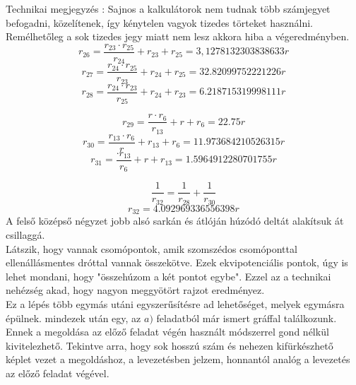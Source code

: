 \documentclass[11pt,a4paper,openany,leqno]{article}
\begin{document}
Technikai megjegyzés : Sajnos a kalkulátorok nem tudnak több számjegyet befogadni, közelítenek, így kénytelen vagyok tizedes törteket használni. Remélhetőleg a sok tizedes jegy miatt nem lesz akkora hiba a végeredményben.\\
$$ r_{26} = \frac{r_{23} \cdot r_{25}}{r_{24}} + r_{23} + r_{25} = 3,1278132303838633r $$
$$ r_{27} = \frac{r_{24} \cdot r_{25}}{r_{23}} + r_{24} + r_{25} = 32.82099752221226r $$
$$ r_{28} = \frac{r_{24} \cdot r_{23}}{r_{25}} + r_{24} + r_{23} = 6.218715319998111r $$

$$ r_{29} = \frac{r \cdot r_{6}}{r_{13}} + r + r_{6} = 22.75r $$
$$ r_{30} = \frac{r_{13} \cdot r_{6}}{r} + r_{13} + r_{6} = 11.973684210526315r $$
$$ r_{31} = \frac{ \cdot r_{13}}{r_{6}} + r + r_{13} = 1.5964912280701755r $$

$$ \frac{1}{r_{32}} = \frac{1}{r_{28}} + \frac{1}{r_{30}} $$
$$ r_{32} = 4.092969336556398r $$
\newpage
A felső középső négyzet jobb alsó sarkán és átlóján húzódó deltát alakítsuk át csillaggá. \\
Látszik, hogy vannak csomópontok, amik szomszédos csomóponttal ellenállásmentes dróttal vannak összekötve. Ezek ekvipotenciális pontok, úgy is lehet mondani, hogy "összehúzom a két pontot egybe". Ezzel az a technikai nehézség akad, hogy nagyon meggyötört rajzot eredményez.\\ \indent
Ez a lépés több egymás utáni egyszerűsítésre ad lehetőséget, melyek egymásra épülnek. mindezek után egy, az $a)$ feladatból már ismert gráffal találkozunk. Ennek a megoldása az előző feladat végén használt módszerrel gond nélkül kivitelezhető. Tekintve arra, hogy sok hosszú szám és nehezen kifürkészhető képlet vezet a megoldáshoz, a levezetésben jelzem, honnantól analóg a levezetés az előző feladat végével.\\
\end{document}
